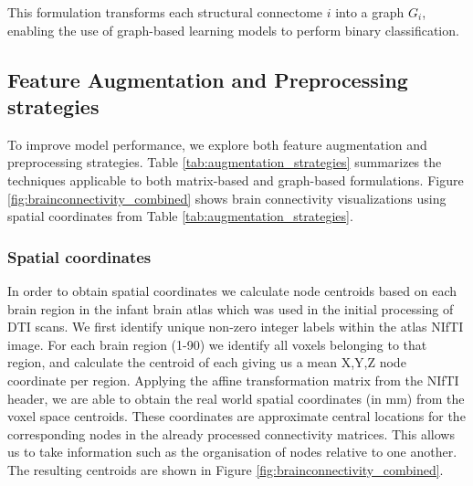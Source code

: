 \documentclass[doubleblind]{ecai}
\begin{document}
This formulation transforms each structural connectome $i$ into a graph $G_i$, enabling the use of graph-based learning models to perform binary classification. 

\subsection{Feature Augmentation and Preprocessing strategies}

To improve model performance, we explore both feature augmentation and preprocessing strategies. Table \ref{tab:augmentation_strategies} summarizes the techniques applicable to both matrix-based and graph-based formulations. Figure \ref{fig:brainconnectivity_combined} shows brain connectivity visualizations using spatial coordinates from Table \ref{tab:augmentation_strategies}.

\subsubsection{Spatial coordinates}
In order to obtain spatial coordinates we calculate node centroids based on each brain region in the infant brain atlas \cite{shi2011infant, schuh2018unbiased} which was used in the initial processing of DTI scans. We first identify unique non-zero integer labels within the atlas NIfTI image. For each brain region (1-90) we identify all voxels belonging to that region, and calculate the centroid of each giving us a mean X,Y,Z node coordinate per region. Applying the affine transformation matrix from the NIfTI header, we are able to obtain the real world spatial coordinates (in mm) from the voxel space centroids. These coordinates are approximate central locations for the corresponding nodes in the already processed connectivity matrices. This allows us to take information such as the organisation of nodes relative to one another. The resulting centroids are shown in Figure \ref{fig:brainconnectivity_combined}.
\end{document}
